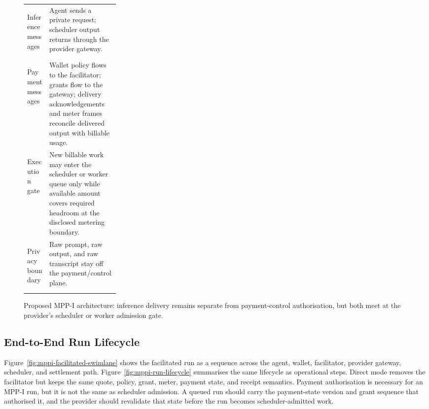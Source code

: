 \documentclass[11pt]{article}
\newcommand{\mppi}{MPP-I}
\begin{document}
\begin{figure}[H]
\vspace{0.35em}
\footnotesize
\begin{tabularx}{0.92\linewidth}{>{\bfseries\raggedright\arraybackslash}p{0.24\linewidth} >{\raggedright\arraybackslash}X}
Inference messages & Agent sends a private request; scheduler output returns through the provider gateway. \\
Payment messages & Wallet policy flows to the facilitator; grants flow to the gateway; delivery acknowledgements and meter frames reconcile delivered output with billable usage. \\
Execution gate & New billable work may enter the scheduler or worker queue only while available amount covers required headroom at the disclosed metering boundary. \\
Privacy boundary & Raw prompt, raw output, and raw transcript stay off the payment/control plane. \\
\end{tabularx}
\caption{Proposed \mppi{} architecture: inference delivery remains separate from payment-control authorisation, but both meet at the provider's scheduler or worker admission gate.}
\label{fig:mppi-architecture}
\end{figure}

\subsection{End-to-End Run Lifecycle}

Figure~\ref{fig:mppi-facilitated-swimlane} shows the facilitated run as a sequence across the agent, wallet, facilitator, provider gateway, scheduler, and settlement path. Figure~\ref{fig:mppi-run-lifecycle} summarises the same lifecycle as operational steps. Direct mode removes the facilitator but keeps the same quote, policy, grant, meter, payment state, and receipt semantics. Payment authorisation is necessary for an \mppi{} run, but it is not the same as scheduler admission. A queued run should carry the payment-state version and grant sequence that authorised it, and the provider should revalidate that state before the run becomes scheduler-admitted work.
\end{document}
